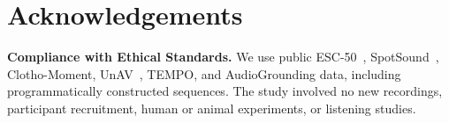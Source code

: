 \section{Acknowledgements}
\noindent\textbf{Compliance with Ethical Standards.}
We use public ESC-50~\cite{piczak2015esc}, SpotSound~\cite{sun2026spotsound}, Clotho-Moment, UnAV~\cite{munakata2025amr}, TEMPO, and AudioGrounding data, including programmatically constructed sequences. The study involved no new recordings, participant recruitment, human or animal experiments, or listening studies.
